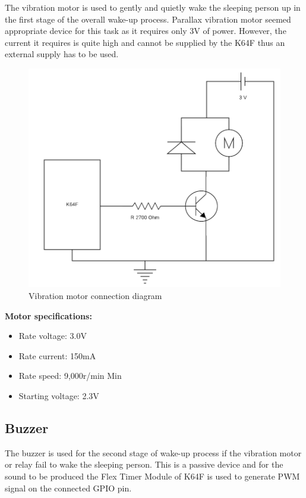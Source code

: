 \documentclass[12pt,a4paper]{article}
\begin{document}
		The vibration motor is used to gently and quietly wake the sleeping person up in the first stage of the overall wake-up process. Parallax vibration motor seemed appropriate device for this task as it requires only 3V of power. However, the current it requires is quite high and cannot be supplied by the K64F thus an external supply has to be used.\\
		
		\begin{figure}[h]
			\centering
			\includegraphics[scale=0.3]{motor_diag1.png}
			\caption{Vibration motor connection diagram}
		\end{figure}

		{\bfseries Motor specifications:}
		\begin{itemize}
			\item Rate voltage: 3.0V
			\item Rate current: 150mA
			\item Rate speed: 9,000r/min Min
			\item Starting voltage: 2.3V
		\end{itemize}

		\subsection{Buzzer}
		The buzzer is used for the second stage of wake-up process if the vibration motor or 
		relay fail to wake the sleeping person. This is a passive device and for the sound to be produced the Flex Timer Module of K64F is used to generate PWM signal on the connected GPIO pin.
		
\end{document}
